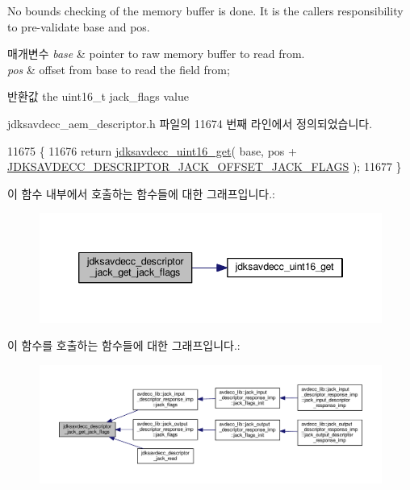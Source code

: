 No bounds checking of the memory buffer is done. It is the caller\textquotesingle{}s responsibility to pre-\/validate base and pos.


\begin{DoxyParams}{매개변수}
{\em base} & pointer to raw memory buffer to read from. \\
\hline
{\em pos} & offset from base to read the field from; \\
\hline
\end{DoxyParams}
\begin{DoxyReturn}{반환값}
the uint16\+\_\+t jack\+\_\+flags value 
\end{DoxyReturn}


jdksavdecc\+\_\+aem\+\_\+descriptor.\+h 파일의 11674 번째 라인에서 정의되었습니다.


\begin{DoxyCode}
11675 \{
11676     \textcolor{keywordflow}{return} \hyperlink{group__endian_ga3fbbbc20be954aa61e039872965b0dc9}{jdksavdecc\_uint16\_get}( base, pos + 
      \hyperlink{group__descriptor__jack_gab61bdeb27f9c6d20dbe464d7e75c593f}{JDKSAVDECC\_DESCRIPTOR\_JACK\_OFFSET\_JACK\_FLAGS} );
11677 \}
\end{DoxyCode}


이 함수 내부에서 호출하는 함수들에 대한 그래프입니다.\+:
\nopagebreak
\begin{figure}[H]
\begin{center}
\leavevmode
\includegraphics[width=346pt]{group__descriptor__jack_gad47529461dd0b81cd2d7273c8cc2c024_cgraph}
\end{center}
\end{figure}




이 함수를 호출하는 함수들에 대한 그래프입니다.\+:
\nopagebreak
\begin{figure}[H]
\begin{center}
\leavevmode
\includegraphics[width=350pt]{group__descriptor__jack_gad47529461dd0b81cd2d7273c8cc2c024_icgraph}
\end{center}
\end{figure}


